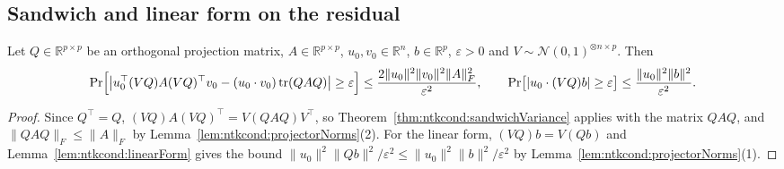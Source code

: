 \subsection{Sandwich and linear form on the residual}

\begin{lemma}\label{lem:ntkcond:sectionBounds}
  \leanok
Let $Q\in\mathbb R^{p\times p}$ be an orthogonal projection matrix, $A\in\mathbb R^{p\times p}$, $u_0,v_0\in\mathbb R^n$, $b\in\mathbb R^p$, $\varepsilon>0$ and $V\sim\mathcal N(0,1)^{\otimes n\times p}$. Then
\[
  \Pr\Bigl[\bigl|u_0^\top(VQ)A(VQ)^\top v_0-(u_0\cdot v_0)\operatorname{tr}(QAQ)\bigr|\ge\varepsilon\Bigr]\le\frac{2\|u_0\|^2\|v_0\|^2\|A\|_F^2}{\varepsilon^2},\qquad
  \Pr\bigl[|u_0\cdot(VQ)b|\ge\varepsilon\bigr]\le\frac{\|u_0\|^2\|b\|^2}{\varepsilon^2}.
\]
\end{lemma}

\begin{proof}
  \leanok
Since $Q^\top=Q$, $(VQ)A(VQ)^\top=V(QAQ)V^\top$, so Theorem~\ref{thm:ntkcond:sandwichVariance} applies with the matrix $QAQ$, and $\|QAQ\|_F\le\|A\|_F$ by Lemma~\ref{lem:ntkcond:projectorNorms}(2). For the linear form, $(VQ)b=V(Qb)$ and Lemma~\ref{lem:ntkcond:linearForm} gives the bound $\|u_0\|^2\|Qb\|^2/\varepsilon^2\le\|u_0\|^2\|b\|^2/\varepsilon^2$ by Lemma~\ref{lem:ntkcond:projectorNorms}(1).
\end{proof}

